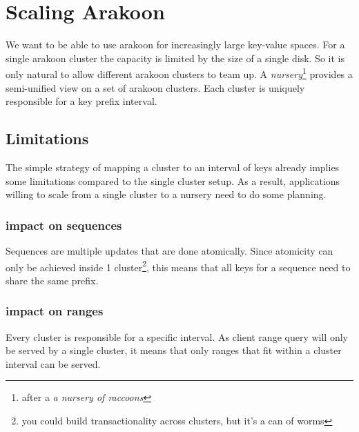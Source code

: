 \section{Scaling Arakoon}
We want to be able to use arakoon for increasingly large key-value spaces. 
For a single arakoon cluster the capacity is limited by the size of a single disk. 
So it is only natural to allow different arakoon clusters to team up. 
A \emph{nursery}\footnote{after a \emph{a nursery of raccoons}} provides a semi-unified view on a set of arakoon clusters. 
Each cluster is uniquely responsible for a key prefix interval. 
\subsection{Limitations}
The simple strategy of mapping a cluster to an interval of keys already implies some limitations compared to the single cluster setup. 
As a result, applications willing to scale from a single cluster to a nursery need to do some planning.
\subsubsection{impact on sequences}
Sequences are multiple updates that are done atomically. 
Since atomicity can only be achieved inside 1 cluster\footnote{you could build transactionality across clusters, but it's a can of worms}, this means that all keys for a sequence need to share the same prefix. 
\subsubsection{impact on ranges}
Every cluster is responsible for a specific interval. 
As client range query will only be served by a single cluster, it means that only ranges that fit within a cluster interval can be served.
